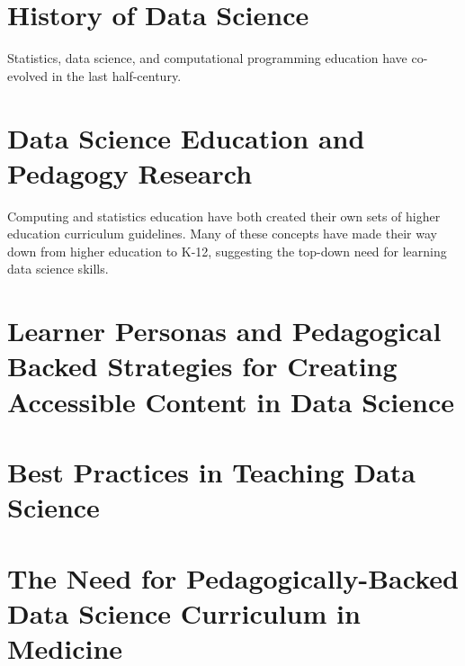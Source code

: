 \documentclass[../main.tex]{subfiles}
\begin{document}
    

    \section{History of Data Science}
        \label{se:intro-ds-history}

        Statistics, data science, and computational programming education
        have co-evolved in the last half-century.

        
        
        
        
        

    \section{Data Science Education and Pedagogy Research}
        \label{se:intro-ds-edu-ped}

        Computing and statistics education have both created their own sets of
        higher education curriculum guidelines.
        Many of these concepts have made their way down from higher education to K-12,
        suggesting the top-down need for learning data science skills.

        
        
        

    \section{Learner Personas and Pedagogical Backed Strategies for Creating Accessible Content in Data Science}
        \label{se:intro-personas}

        

    \section{Best Practices in Teaching Data Science}
        \label{se:intro-teaching-best-practices-ds}

        

    \section{The Need for Pedagogically-Backed Data Science Curriculum in Medicine}
        \label{se:intro-ds-edu-gaps}
\end{document}
